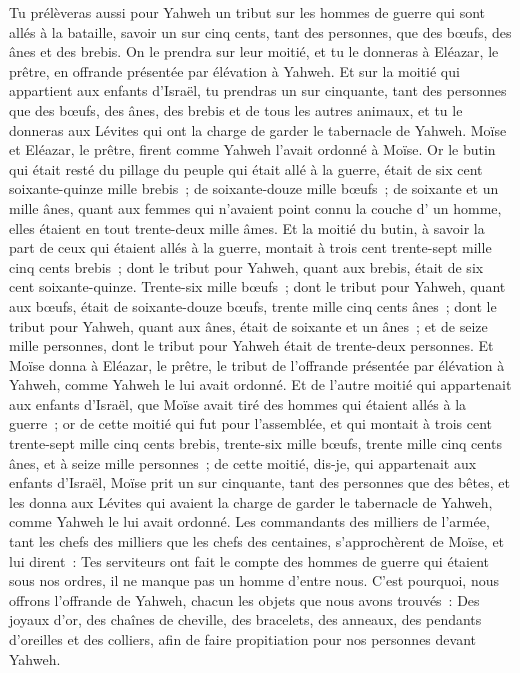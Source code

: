\begin{multicols}{2}
Tu prélèveras aussi pour Yahweh un tribut sur les hommes de guerre qui sont allés à la bataille, savoir un sur cinq cents, tant des personnes, que des bœufs, des ânes et des brebis.
On le prendra sur leur moitié, et tu le donneras à Eléazar, le prêtre, en offrande présentée par élévation à Yahweh.
Et sur la moitié qui appartient aux enfants d'Israël, tu prendras un sur cinquante, tant des personnes que des bœufs, des ânes, des brebis et de tous les autres animaux, et tu le donneras aux Lévites qui ont la charge de garder le tabernacle de Yahweh.
Moïse et Eléazar, le prêtre, firent comme Yahweh l'avait ordonné à Moïse.
Or le butin qui était resté du pillage du peuple qui était allé à la guerre, était de six cent soixante-quinze mille brebis~;
de soixante-douze mille bœufs~;
de soixante et un mille ânes,
quant aux femmes qui n'avaient point connu la couche d' un homme, elles étaient en tout trente-deux mille âmes.
Et la moitié du butin, à savoir la part de ceux qui étaient allés à la guerre, montait à trois cent trente-sept mille cinq cents brebis~;
dont le tribut pour Yahweh, quant aux brebis, était de six cent soixante-quinze.
Trente-six mille bœufs~; dont le tribut pour Yahweh, quant aux bœufs, était de soixante-douze bœufs,
trente mille cinq cents ânes~; dont le tribut pour Yahweh, quant aux ânes, était de soixante et un ânes~;
et de seize mille personnes, dont le tribut pour Yahweh était de trente-deux personnes.
Et Moïse donna à Eléazar, le prêtre, le tribut de l'offrande présentée par élévation à Yahweh, comme Yahweh le lui avait ordonné.
Et de l'autre moitié qui appartenait aux enfants d'Israël, que Moïse avait tiré des hommes qui étaient allés à la guerre~;
or de cette moitié qui fut pour l'assemblée, et qui montait à trois cent trente-sept mille cinq cents brebis,
trente-six mille bœufs,
trente mille cinq cents ânes,
et à seize mille personnes~;
de cette moitié, dis-je, qui appartenait aux enfants d'Israël, Moïse prit un sur cinquante, tant des personnes que des bêtes, et les donna aux Lévites qui avaient la charge de garder le tabernacle de Yahweh, comme Yahweh le lui avait ordonné.
Les commandants des milliers de l'armée, tant les chefs des milliers que les chefs des centaines, s'approchèrent de Moïse,
et lui dirent~: Tes serviteurs ont fait le compte des hommes de guerre qui étaient sous nos ordres, il ne manque pas un homme d'entre nous.
C'est pourquoi, nous offrons l'offrande de Yahweh, chacun les objets que nous avons trouvés~: Des joyaux d'or, des chaînes de cheville, des bracelets, des anneaux, des pendants d'oreilles et des colliers, afin de faire propitiation pour nos personnes devant Yahweh.

\end{multicols}
